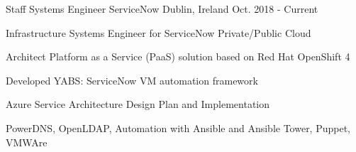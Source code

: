 

\begin{cventries}

  \cventry
    {Staff Systems Engineer} %
    {ServiceNow} %
    {Dublin, Ireland} %
    {Oct. 2018 - Current} %
    {
      \begin{cvitems} %
        \item {Infrastructure Systems Engineer for ServiceNow Private/Public Cloud}
        \item {Architect Platform as a Service (PaaS) solution based on Red Hat OpenShift 4}
        \item {Developed YABS: ServiceNow VM automation framework}
        \item {Azure Service Architecture Design Plan and Implementation}
        \item {PowerDNS, OpenLDAP, Automation with Ansible and Ansible Tower, Puppet, VMWAre}
      \end{cvitems}
    }


\end{cventries}
